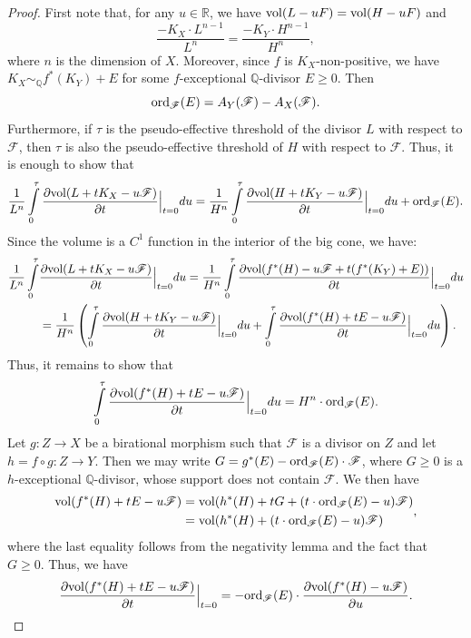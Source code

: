 \documentclass[12pt]{amsart}
\theoremstyle{definition}
\theoremstyle{remark}
\begin{document}
\begin{proof}
First note that, for any $u\in \mathbb{R}$, we have ${\rm vol}(L-uF)={\rm vol}(H-uF)$ and
$$
\frac{-K_X\cdot L^{n-1}}{L^n}=\frac{-K_Y\cdot H^{n-1}}{H^n},
$$
where $n$ is the dimension of $X$.
Moreover, since $f$ is $K_X$-non-positive, we have $K_X\sim_{\mathbb{Q}} f^*(K_Y)+E$ for some $f$-exceptional $\mathbb Q$-divisor $E\geqslant 0$. Then
$$
{\rm ord}_\mathscr{F}(E)= A_Y(\mathscr{F})-A_X(\mathscr{F}).
$$
Furthermore, if $\tau$ is the pseudo-effective threshold of the divisor $L$ with respect to $\mathscr{F}$, then $\tau$ is also the pseudo-effective threshold of $H$ with respect to $\mathscr{F}$. Thus, it is enough to show that
$$\frac 1 {L^n}\int\limits_0^\tau  \frac {\partial {\rm vol}(L+tK_X-u\mathscr{F}) }{\partial t}\Big\vert_{t=0}du
=\frac 1 {H^n}\int\limits_0^\tau \frac {\partial {\rm vol}(H+tK_Y-u\mathscr{F}) }{\partial t}\Big\vert_{t=0}du + {\rm ord}_\mathscr{F}(E).
$$
Since the volume is a $C^1$ function in the interior of the big cone, we have:
$$\begin{aligned}
\frac 1 {L^n}\int\limits_0^\tau  & \frac {\partial {\rm vol}(L+tK_X-u\mathscr{F}) }{\partial t}\Big\vert_{t=0}du= \frac 1 {H^n}\int\limits_0^\tau \frac {\partial {\rm vol}(f^*(H)-u\mathscr{F} + t(f^*(K_Y)+E)) }{\partial t}\Big\vert_{t=0}du\\
&=\frac 1 {H^n}\left(\int\limits_0^\tau \frac {\partial {\rm vol}(H+tK_Y-u\mathscr{F})  }{\partial t}\Big\vert_{t=0}du+
\int\limits_0^\tau \frac {\partial {\rm vol}(f^*(H)+tE-u\mathscr{F})  }{\partial t}\Big\vert_{t=0}du
\right).
\end{aligned}
$$
Thus, it remains to show that
$$\int\limits_0^\tau \frac {\partial {\rm vol}(f^*(H)+tE-u\mathscr{F})  }{\partial t}\Big\vert_{t=0}du=H^n\cdot {\rm ord}_\mathscr{F}(E).
$$
Let $g\colon Z\to X$ be a birational morphism such that $\mathscr{F}$ is a divisor on $Z$ and let $h=f\circ g\colon Z\to Y$. Then we may write $G=g^*(E)-{\rm ord}_\mathscr{F}(E)\cdot \mathscr{F}$, where $G\geqslant 0$ is a $h$-exceptional $\mathbb Q$-divisor, whose support does not contain $\mathscr{F}$.
We then have
$$
\begin{aligned}
{\rm vol}(f^*(H)+tE-u\mathscr{F})&=  {\rm vol}(h^*(H)+tG + (t\cdot {\rm ord}_\mathscr{F}(E)-u)\mathscr{F})\\
&= {\rm vol}(h^*(H)+ (t\cdot {\rm ord}_\mathscr{F}(E)-u)\mathscr{F})
\end{aligned},
$$
where the last equality follows from the negativity lemma and the fact that $G\geqslant 0$.
Thus, we have
$$\frac {\partial {\rm vol}(f^*(H)+tE-u\mathscr{F})  }{\partial t}\Big\vert_{t=0}=-{\rm ord}_\mathscr{F}(E) \cdot \frac {\partial {\rm vol}(f^*(H)-u\mathscr{F})  }{\partial u}.
$$
\end{proof}
\end{document}
